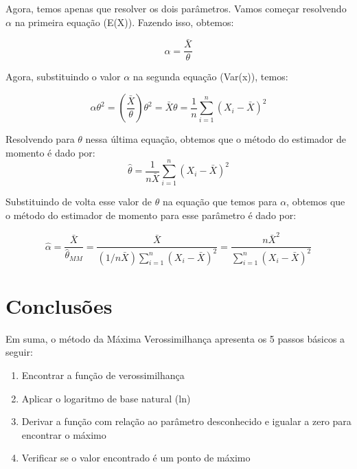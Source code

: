 Agora, temos apenas que resolver os dois parâmetros. Vamos  começar resolvendo \begin{math} \alpha \end{math} na primeira equação (E(X)). Fazendo isso, obtemos:


\begin{equation}
	\alpha=\dfrac{\bar{X}}{\theta}
\end{equation}

Agora, substituindo o valor \begin{math} \alpha \end{math} na segunda equação (Var(x)), temos:

\begin{equation}
\alpha\theta^2=\left(\dfrac{\bar{X}}{\theta}\right)\theta^2=\bar{X}\theta=\dfrac{1}{n}\sum\limits_{i=1}^n (X_i-\bar{X})^2
\end{equation}

Resolvendo para \begin{math} \theta \end{math} nessa última equação, obtemos que o método do estimador de momento é dado por:
\begin{equation}
\hat{\theta}=\dfrac{1}{n\bar{X}}\sum\limits_{i=1}^n (X_i-\bar{X})^2
\end{equation}

Substituindo de volta esse valor de  \begin{math} \theta \end{math} na equação que temos para \begin{math} \alpha \end{math}, obtemos que o método do estimador de momento para esse parâmetro é dado por:

\begin{equation}
\hat{\alpha}=\dfrac{\bar{X}}{\hat{\theta}_{MM}}=\dfrac{\bar{X}}{(1/n\bar{X})\sum\limits_{i=1}^n (X_i-\bar{X})^2}=\dfrac{n\bar{X}^2}{\sum\limits_{i=1}^n (X_i-\bar{X})^2}
\end{equation}

\section{Conclusões}

Em suma, o método da Máxima Verossimilhança apresenta os 5 passos básicos a seguir:

\begin{enumerate}
\item Encontrar a função de verossimilhança
\item Aplicar o logaritmo de base natural (ln)
\item Derivar a função com relação ao parâmetro desconhecido e igualar a zero para encontrar o máximo
\item Verificar se o valor encontrado é um ponto de máximo
\end{enumerate}

